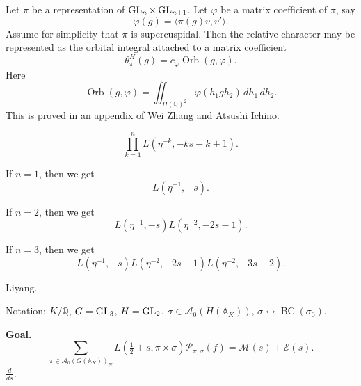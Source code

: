 \documentclass[reqno]{amsart} 
\begin{document}
\begin{remark}\label{remark:cnfg5j2du3}
  Let $\pi$ be a representation of $\operatorname{GL}_n \times \operatorname{GL}_{n + 1}$.  Let $\varphi$ be a matrix coefficient of $\pi$, say
  \begin{equation*}
    \varphi(g) = \langle \pi(g) v, v' \rangle.
  \end{equation*}
  Assume for simplicity that $\pi$ is supercuspidal.  Then the relative character may be represented as the orbital integral attached to a matrix coefficient
  \begin{equation*}
    \theta_\pi^H(g) = c_\varphi \operatorname{Orb}(g, \varphi).
  \end{equation*}
  Here
  \begin{equation*}
    \operatorname{Orb}(g, \varphi) = \iint_{H(\mathbb{Q})^2} \varphi(h_1  g h_2) \, d h_1 \, d h_2.
  \end{equation*}
  This is proved in an appendix of Wei Zhang and Atsushi Ichino.
\end{remark}

\begin{equation*}
  \prod_{k = 1 }^n L(
  \eta^{-k},
  - k s - k + 1
  ).
\end{equation*}

\begin{example}\label{example:cnfg5j2iii}
  If $n = 1$, then we get
  \begin{equation*}
    L(\eta^{-1}, - s).
  \end{equation*}
\end{example}
\begin{example}\label{example:cnfg5j2kbr}
  If $n =2$, then we get
  \begin{equation*}
    L(\eta^{-1}, - s) L(\eta^{-2}, - 2 s -1).
  \end{equation*}
\end{example}
\begin{example}\label{example:cnfg5j2k8u}
  If $n=3$, then we get
  \begin{equation*}
    L(\eta^{-1}, - s) L(\eta^{-2}, - 2 s -1) L(\eta^{-2}, - 3 s - 2).
  \end{equation*}
\end{example}

Liyang.

Notation: $K/\mathbb{Q}$, $G = \operatorname{GL}_3$, $H = \operatorname{GL}_2$, $\sigma \in \mathcal{A}_0(H(\mathbb{A}_K))$, $\sigma \leftrightarrow \operatorname{BC}(\sigma_0)$.

\textbf{Goal.}
\begin{equation*}
  \sum_{\pi \in \mathcal{A}_0(G(\mathbb{A}_K ))_N}
  L(\tfrac{1}{2} + s, \pi \times \sigma)
  \mathcal{P}_{\pi, \sigma }(f)
  = \mathcal{M}(s) + \mathcal{E}(s).
\end{equation*}
$\frac{d}{d s}$.
\end{document}
